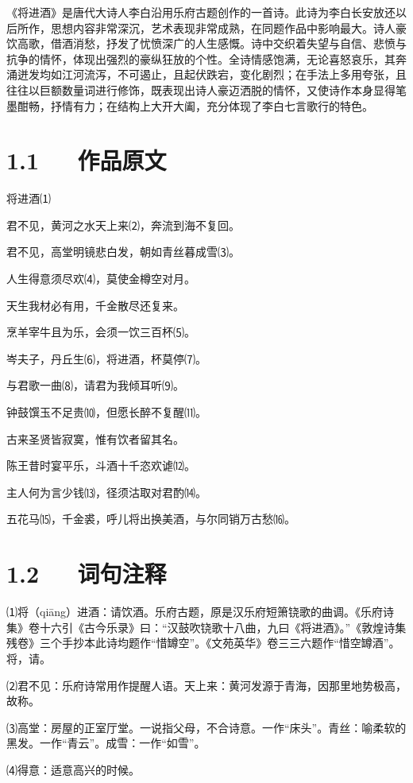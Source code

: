 \documentclass[letterpaper,10pt,english]{sphinxmanual}
\begin{document}
《将进酒》是唐代大诗人李白沿用乐府古题创作的一首诗。此诗为李白长安放还以后所作，思想内容非常深沉，艺术表现非常成熟，在同题作品中影响最大。诗人豪饮高歌，借酒消愁，抒发了忧愤深广的人生感慨。诗中交织着失望与自信、悲愤与抗争的情怀，体现出强烈的豪纵狂放的个性。全诗情感饱满，无论喜怒哀乐，其奔涌迸发均如江河流泻，不可遏止，且起伏跌宕，变化剧烈；在手法上多用夸张，且往往以巨额数量词进行修饰，既表现出诗人豪迈洒脱的情怀，又使诗作本身显得笔墨酣畅，抒情有力；在结构上大开大阖，充分体现了李白七言歌行的特色。


\section{1.1   作品原文}
\label{\detokenize{p01_u6563_u6587/_u674e_u767d-_u5c06_u8fdb_u9152:id3}}
将进酒⑴

君不见，黄河之水天上来⑵，奔流到海不复回。

君不见，高堂明镜悲白发，朝如青丝暮成雪⑶。

人生得意须尽欢⑷，莫使金樽空对月。

天生我材必有用，千金散尽还复来。

烹羊宰牛且为乐，会须一饮三百杯⑸。

岑夫子，丹丘生⑹，将进酒，杯莫停⑺。

与君歌一曲⑻，请君为我倾耳听⑼。

钟鼓馔玉不足贵⑽，但愿长醉不复醒⑾。

古来圣贤皆寂寞，惟有饮者留其名。

陈王昔时宴平乐，斗酒十千恣欢谑⑿。

主人何为言少钱⒀，径须沽取对君酌⒁。

五花马⒂，千金裘，呼儿将出换美酒，与尔同销万古愁⒃。


\section{1.2   词句注释}
\label{\detokenize{p01_u6563_u6587/_u674e_u767d-_u5c06_u8fdb_u9152:id4}}
⑴将（qiāng）进酒：请饮酒。乐府古题，原是汉乐府短箫铙歌的曲调。《乐府诗集》卷十六引《古今乐录》曰：“汉鼓吹铙歌十八曲，九曰《将进酒》。”《敦煌诗集残卷》三个手抄本此诗均题作“惜罇空”。《文苑英华》卷三三六题作“惜空罇酒”。将，请。

⑵君不见：乐府诗常用作提醒人语。天上来：黄河发源于青海，因那里地势极高，故称。

⑶高堂：房屋的正室厅堂。一说指父母，不合诗意。一作“床头”。青丝：喻柔软的黑发。一作“青云”。成雪：一作“如雪”。

⑷得意：适意高兴的时候。
\end{document}
